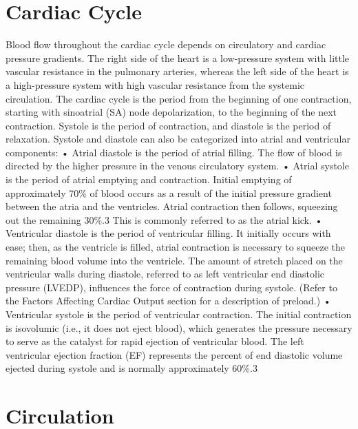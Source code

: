 
\section{Cardiac Cycle}

Blood flow throughout the cardiac cycle depends on circulatory and cardiac pressure gradients. The right side of the heart is a low-pressure system with little vascular resistance in the pulmonary arteries, whereas the left side of the heart is a high-pressure system with high vascular resistance from the systemic circulation. The cardiac cycle is the period from the beginning of one contraction, starting with sinoatrial (SA) node depolarization, to the beginning of the next contraction. Systole is the period of contraction, and diastole is the period of relaxation. Systole and diastole can also be categorized into atrial and ventricular components:
•	Atrial diastole is the period of atrial filling. The flow of blood is directed by the higher pressure in the venous circulatory system.
•	Atrial systole is the period of atrial emptying and contraction. Initial emptying of approximately 70\% of blood occurs as a result of the initial pressure gradient between the atria and the ventricles. Atrial contraction then follows, squeezing out the remaining 30\%.3 This is commonly referred to as the atrial kick.
•	Ventricular diastole is the period of ventricular filling. It initially occurs with ease; then, as the ventricle is filled, atrial contraction is necessary to squeeze the remaining blood volume into the ventricle. The amount of stretch placed on the ventricular walls during diastole, referred to as left ventricular end diastolic pressure (LVEDP), influences the force of contraction during systole. (Refer to the Factors Affecting Cardiac Output section for a description of preload.)
•	Ventricular systole is the period of ventricular contraction. The initial contraction is isovolumic (i.e., it does not eject blood), which generates the pressure necessary to serve as the catalyst for rapid ejection of ventricular blood. The left ventricular ejection fraction (EF) represents the percent of end diastolic volume ejected during systole and is normally approximately 60\%.3


\section{Circulation}

